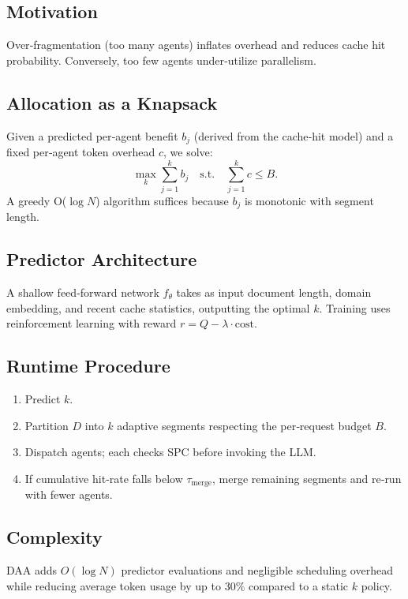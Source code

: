 \documentclass[conference]{IEEEtran}
\begin{document}
\subsection{Motivation}
Over‑fragmentation (too many agents) inflates overhead and reduces cache hit probability.  Conversely, too few agents under‑utilize parallelism.

\subsection{Allocation as a Knapsack}
Given a predicted per‑agent benefit $b_j$ (derived from the cache‑hit model) and a fixed per‑agent token overhead $c$, we solve:
\begin{equation}
\max_{k} \sum_{j=1}^{k} b_j \quad \text{s.t.}\quad \sum_{j=1}^{k} c \le B.
\end{equation}
A greedy O($\log N$) algorithm suffices because $b_j$ is monotonic with segment length.

\subsection{Predictor Architecture}
A shallow feed‑forward network $f_{\theta}$ takes as input document length, domain embedding, and recent cache statistics, outputting the optimal $k$.  Training uses reinforcement learning with reward $r = Q - \lambda \cdot \text{cost}$.

\subsection{Runtime Procedure}
\begin{enumerate}
\item Predict $k$.
\item Partition $D$ into $k$ adaptive segments respecting the per‑request budget $B$.
\item Dispatch agents; each checks SPC before invoking the LLM.
\item If cumulative hit‑rate falls below $\tau_{\text{merge}}$, merge remaining segments and re‑run with fewer agents.
\end{enumerate}

\subsection{Complexity}
DAA adds $O(\log N)$ predictor evaluations and negligible scheduling overhead while reducing average token usage by up to $30\%$ compared to a static $k$ policy.
\end{document}
